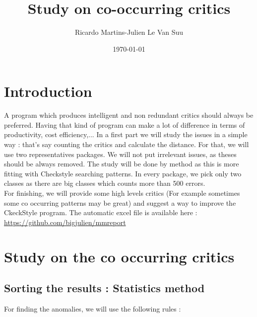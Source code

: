 \documentclass{article}
\begin{document}
\title{Study on co-occurring critics}
\author{Ricardo Martins-Julien Le Van Suu}
\date\today
\maketitle
\section{Introduction}
A program which produces intelligent and non redundant critics should always be preferred. Having that kind of program can make a lot of difference in terms of productivity, cost efficiency,... 
In a first part we will study the issues in a simple way : that's say counting the critics and calculate the distance.
For that, we will use two representatives packages. We will not put irrelevant issues, as theses should be always removed. The study will be done by method as this is more fitting with Checkstyle searching patterns. In every package, we pick only two classes as there are big classes which counts more than 500 errors. \\
For finishing, we will provide some high levels critics (For example sometimes some co occurring patterns may be great) and suggest a way to improve the CkeckStyle program. The automatic excel file is available here : \url{https://github.com/bigjulien/mmreport}


\section{Study on the co occurring critics}

\subsection{Sorting the results : Statistics method} 
For finding the anomalies, we will use the following rules : 
\end{document}
